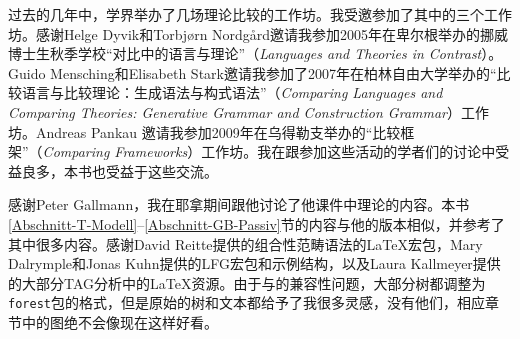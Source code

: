 过去的几年中，学界举办了几场理论比较的工作坊。我受邀参加了其中的三个工作坊。感谢Helge Dyvik和Torbjørn Nordgård邀请我参加2005年在卑尔根举办的挪威博士生秋季学校“对比中的语言与理论”（\emph{Languages and Theories in Contrast}）。Guido Mensching和Elisabeth
Stark邀请我参加了2007年在柏林自由大学举办的“比较语言与比较理论：生成语法与构式语法”（\emph{Comparing Languages and Comparing Theories:
  Generative Grammar and Construction Grammar}）工作坊。Andreas Pankau 邀请我参加2009年在乌得勒支举办的“比较框架”（\emph{Comparing
  Frameworks}）工作坊。我在跟参加这些活动的学者们的讨论中受益良多，本书也受益于这些交流。

感谢Peter Gallmann，我在耶拿期间跟他讨论了他课件中\gb 理论的内容。本书\ref{Abschnitt-T-Modell}--\ref{Abschnitt-GB-Passiv}节的内容与他的版本相似，并参考了其中很多内容。感谢David Reitte提供的组合性范畴语法的\LaTeX{}宏包，Mary Dalrymple和Jonas Kuhn提供的LFG宏包和示例结构，以及Laura Kallmeyer提供的大部分TAG分析中的\LaTeX{}资源。由于与\XeLaTeX 的兼容性问题，大部分树都调整为\texttt{forest}包的格式，但是原始的树和文本都给予了我很多灵感，没有他们，相应章节中的图绝不会像现在这样好看。

